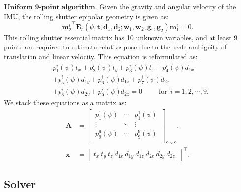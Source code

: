 \documentclass[10pt,twocolumn,letterpaper]{article}
\theoremstyle{definition}
\begin{document}
	\vspace{3mm}
	\noindent $\textbf{Uniform 9-point algorithm.}$
	Given the gravity and angular velocity of the IMU, the rolling shutter epipolar geometry is given as: 
	\begin{equation}
	{\mathbf{m}_{2}^{i}}^{\top} \mathbf{E}_{r} (\psi,\mathbf{t},\mathbf{d}_1,\mathbf{d}_2  ; \mathbf{w}_1, \mathbf{w}_2, \mathbf{g}_1, \mathbf{g}_2)  \mathbf{m}_{1}^{i} = 0 .
	\label{eq:rolling_shutter_epipolar_geometry}
	\end{equation}
	This rolling shutter essential matrix  has 10 unknown variables, and at least 9 points are required to estimate relative pose due to the scale ambiguity of translation and linear velocity.
	This equation is reformulated as:
	\begin{equation}
	\begin{split}
	& p_{1}^i(\psi) t_x + p_{2}^i(\psi) t_y + p_{3}^i(\psi) t_z + p_{4}^i(\psi) d_{1x} \\ 
	& + p_{5}^i(\psi) d_{1y} + p_{6}^i(\psi) d_{1z} + p_{7}^i(\psi) d_{2x} \\
	& + p_{8}^i(\psi) d_{2y} + p_{9}^i(\psi) d_{2z} =   0    \  \ \ \ \ \ \ \ \ \ \  \text{for} \ \ i = 1,2,\cdots,9.
	\end{split}
	\end{equation}
	We stack these equations as a matrix as:
	\begin{equation}
	\begin{split}
	\mathbf{A} &= 
	\begin{bmatrix}
	\ p_{1}^1(\psi) & \cdots & p_{1}^1(\psi) \ \\
	\ \vdots & \ddots & \vdots \ \\
	\ p_{9}^9(\psi) & \cdots & p_{9}^9(\psi) \ \\
	\end{bmatrix}_{9 \times 9} ,
	\\
	\mathbf{x} &= 
	\begin{bmatrix}
	t_x \ 
	t_y \
	t_z \
	d_{1x} \
	d_{1y} \
	d_{1z} \
	d_{2x} \
	d_{2y} \
	d_{2z} \
	\end{bmatrix}^{\top} .
	\end{split}
	\end{equation}
	
	
	\subsection{Solver} \label{subsec:solver}
	
\end{document}
